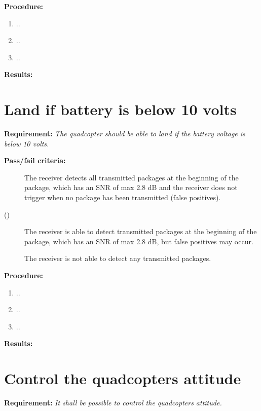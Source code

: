 \textbf{Procedure:}\\
\begin{enumerate}
	\item ..
	\item ..
	\item ..
\end{enumerate} 


\textbf{Results:}


\newpage

\section{Land if battery is below 10 volts}
\textbf{Requirement:}
\textit{The quadcopter should be able to land if the battery voltage is below 10 volts.}

\textbf{Pass/fail criteria:}
	\begin{description}
	\item[  ] The receiver detects all transmitted packages at the beginning of the package, which has an SNR of max 2.8 dB and the receiver does not trigger when no package has been transmitted (false positives).
	\item[()]The receiver is able to detect transmitted packages at the beginning of the package, which has an SNR of max 2.8 dB, but false positives may occur.
	\item[  \phantom{)}]The receiver is not able to detect any transmitted packages.
	\end{description}

		
\textbf{Procedure:}\\


\begin{enumerate}
	\item ..
	\item ..
	\item ..
\end{enumerate} 


\textbf{Results:}


\newpage

\section{Control the quadcopters attitude}
\textbf{Requirement:}
\textit{It shall be possible to control the quadcopters attitude.}

